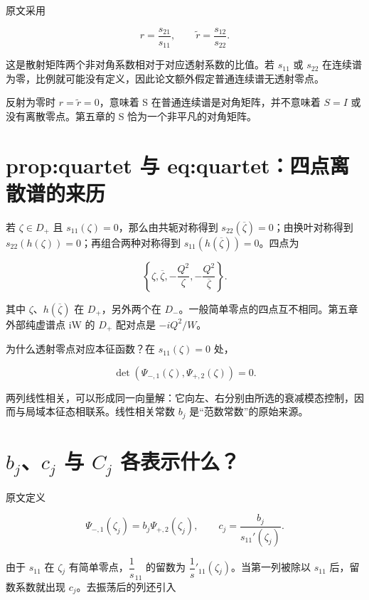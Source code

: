 原文采用\par

\[
r=\dfrac{s_{21}}{s_{11}},
\qquad
\widetilde r=\dfrac{s_{12}}{s_{22}}.
\]

这是散射矩阵两个非对角系数相对于对应透射系数的比值。若 $s_{11}$ 或 $s_{22}$ 在连续谱为零，比例就可能没有定义，因此论文额外假定普通连续谱无透射零点。\par

反射为零时 $r=\widetilde r=0$，意味着 S 在普通连续谱是对角矩阵，并不意味着 $S=I$ 或没有离散零点。第五章的 S 恰为一个非平凡的对角矩阵。\par

\section{prop:quartet 与 eq:quartet：四点离散谱的来历}

若 $\zeta{}\in{}D_{+}$ 且 $s_{11}(\zeta{})=0$，那么由共轭对称得到 $s_{22}(\overline \zeta{})=0$；由换叶对称得到 $s_{22}(h(\zeta{}))=0$；再组合两种对称得到 $s_{11}(h(\overline \zeta{}))=0$。四点为\par

\[
\left\{\zeta,\overline\zeta,-\dfrac{Q^2}{\zeta},-\dfrac{Q^2}{\overline\zeta}\right\}.
\]

其中 $\zeta{}$、$h(\overline \zeta{})$ 在 $D_{+}$，另外两个在 $D_{-}$。一般简单零点的四点互不相同。第五章外部纯虚谱点 iW 的 $D_{+}$ 配对点是 $-iQ^{2}/W$。\par

为什么透射零点对应本征函数？在 $s_{11}(\zeta{})=0$ 处，\par

\[
\det(\Psi_{-,1}(\zeta),\Psi_{+,2}(\zeta))=0.
\]

两列线性相关，可以形成同一向量解：它向左、右分别由所选的衰减模态控制，因而与局域本征态相联系。线性相关常数 $b_j$ 是“范数常数”的原始来源。\par

\section{\texorpdfstring{$b_j$、$c_j$ 与 $C_j$}{bj, cj 与 Cj} 各表示什么？}

原文定义\par

\[
\Psi_{-,1}(\zeta_j)=b_j\Psi_{+,2}(\zeta_j),
\qquad
c_j=\dfrac{b_j}{s_{11}'(\zeta_j)}.
\]

由于 $s_{11}$ 在 $\zeta{}_j$ 有简单零点，$\dfrac{1}{s}_{11}$ 的留数为 $\dfrac{1}{s}'_{11}(\zeta{}_j)$。当第一列被除以 $s_{11}$ 后，留数系数就出现 $c_j$。去振荡后的列还引入\par

